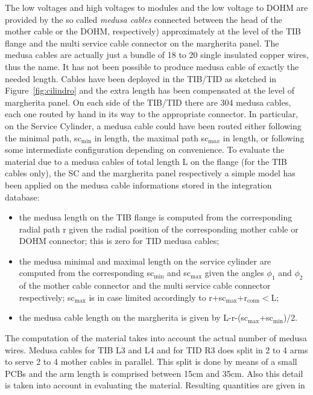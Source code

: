 The low voltages and high voltages to modules and the low voltage to
DOHM are provided by the so called {\em medusa cables} connected
between the head of the mother cable or the DOHM, respectively)
approximately at the level of the TIB flange and the multi service
cable connector on the margherita panel. The medusa cables are
actually just a bundle of 18 to 20 single insulated copper wires, thus
the name. It has not been possible to produce medusa cable of exactly
the needed length. Cables have been deployed in the TIB/TID as
sketched in Figure~\ref{fig:cilindro} and the extra length has been
compensated at the level of margherita panel. On each side of the
TIB/TID there are 304 medusa cables, each one routed by hand in its
way to the appropriate connector. In particular, on the Service
Cylinder, a medusa cable could have been routed either following the
minimal path, sc$_{\mathrm{min}}$ in length, the maximal path
sc$_{\mathrm max}$ in length, or following some intermediate
configuration depending on convenience. To evaluate the material due
to a medusa cables of total length L on the flange (for the TIB cables
only), the SC and the margherita panel respectively a simple model has
been applied on the medusa cable informations stored in the
integration database: 
\begin{itemize}
\item the medusa length on the TIB flange is computed from the
  corresponding radial path r given the radial position of the
  corresponding mother cable or DOHM connector; this is zero for TID
  medusa cables; 
\item the medusa minimal and maximal length on the service cylinder
  are computed from the corresponding  sc$_{\mathrm{min}}$  and
  sc$_{\mathrm{max}}$ given the angles $\phi_1$ and $\phi_2$ of the
  mother cable connector and the multi service cable connector
  respectively; sc$_{\mathrm{max}}$ is in case limited accordingly to
  r+sc$_{\mathrm{max}}$+r$_{\mathrm{conn}}<$L; 
\item the medusa cable length on the margherita is given by
  L-r-(sc$_{\mathrm{max}}$+sc$_{\mathrm{min}}$)/2.
\end{itemize}
The computation of the material takes into account the actual number
of medusa wires. Medusa cables for TIB L3 and L4 and for TID R3 does
split in 2 to 4 arms to serve 2 to 4 mother cables in parallel. This
split is done by means of a small PCBs and the arm length is comprised
between 15cm and 35cm. Also this detail is taken into account in
evaluating the material. Resulting quantities are given in
